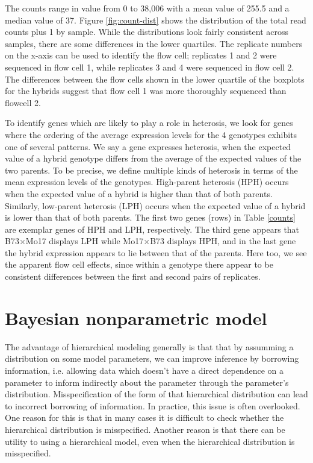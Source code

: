 The counts range in value from 0 to 38,006 with a mean value of 255.5 and a median value of 37. Figure \ref{fig:count-dist} shows the distribution of the total read counts plus 1 by sample. While the distributions look fairly consistent across samples, there are some differences in the lower quartiles. The replicate numbers on the x-axis can be used to identify the flow cell; replicates 1 and 2 were sequenced in flow cell 1, while replicates 3 and 4 were sequenced in flow cell 2. The differences between the flow cells shown in the lower quartile of the boxplots for the hybrids suggest that flow cell 1 was more thoroughly sequenced than flowcell 2.


To identify genes which are likely to play a role in heterosis, we look for genes where the ordering of the average expression levels for the 4 genotypes exhibits one of several patterns. We say a gene expresses heterosis, when the expected value of a hybrid genotype differs from the average of the expected values of the two parents. To be precise, we define multiple kinds of heterosis in terms of the mean expression levels of the genotypes. High-parent heterosis (HPH) occurs when the expected value of a hybrid is higher than that of both parents. Similarly, low-parent heterosis (LPH) occurs when the expected value of a hybrid is lower than that of both parents. The first two genes (rows) in Table \ref{counts} are exemplar genes of HPH and LPH, respectively. The third gene appears that B73$\times$Mo17 displays LPH while Mo17$\times$B73 displays HPH, and in the last gene the hybrid expression appears to lie between that of the parents. Here too, we see the apparent flow cell effects, since within a genotype there appear to be consistent differences between the first and second pairs of replicates.

\section{Bayesian nonparametric model}
The advantage of hierarchical modeling generally is that that by assumming a distribution on some model parameters, we can improve inference by borrowing information, i.e. allowing data which doesn't have a direct dependence on a parameter to inform indirectly about the parameter through the parameter's distribution. Misspecification of the form of that hierarchical distribution can lead to incorrect borrowing of information. In practice, this issue is often overlooked. One reason for this is that in many cases it is difficult to check whether the hierarchical distribution is misspecified. Another reason is that there can be utility to using a hierarchical model, even when the hierarchical distribution is misspecified.

